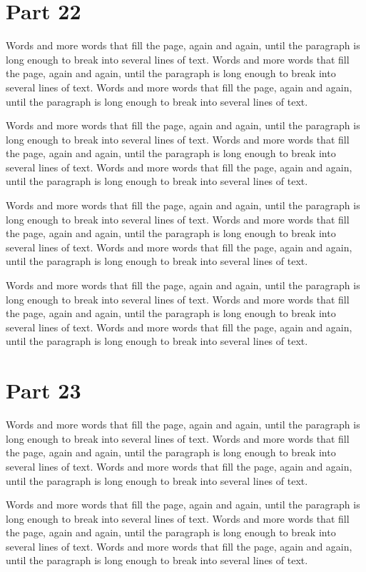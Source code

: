 \documentclass{article}
\begin{document}
\section{Part 22}
Words and more words that fill the page, again and again, until the paragraph is long enough to break into several lines of text. Words and more words that fill the page, again and again, until the paragraph is long enough to break into several lines of text. Words and more words that fill the page, again and again, until the paragraph is long enough to break into several lines of text. 

Words and more words that fill the page, again and again, until the paragraph is long enough to break into several lines of text. Words and more words that fill the page, again and again, until the paragraph is long enough to break into several lines of text. Words and more words that fill the page, again and again, until the paragraph is long enough to break into several lines of text. 

Words and more words that fill the page, again and again, until the paragraph is long enough to break into several lines of text. Words and more words that fill the page, again and again, until the paragraph is long enough to break into several lines of text. Words and more words that fill the page, again and again, until the paragraph is long enough to break into several lines of text. 

Words and more words that fill the page, again and again, until the paragraph is long enough to break into several lines of text. Words and more words that fill the page, again and again, until the paragraph is long enough to break into several lines of text. Words and more words that fill the page, again and again, until the paragraph is long enough to break into several lines of text. 

\section{Part 23}
Words and more words that fill the page, again and again, until the paragraph is long enough to break into several lines of text. Words and more words that fill the page, again and again, until the paragraph is long enough to break into several lines of text. Words and more words that fill the page, again and again, until the paragraph is long enough to break into several lines of text. 

Words and more words that fill the page, again and again, until the paragraph is long enough to break into several lines of text. Words and more words that fill the page, again and again, until the paragraph is long enough to break into several lines of text. Words and more words that fill the page, again and again, until the paragraph is long enough to break into several lines of text. 
\end{document}
